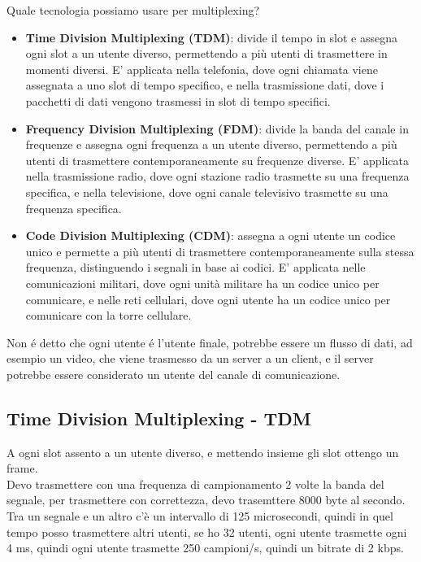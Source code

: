 Quale tecnologia possiamo usare per multiplexing? 
\begin{itemize}
    \item \textbf{Time Division Multiplexing (TDM)}: divide il tempo in slot e assegna ogni 
    slot a un utente diverso, permettendo a più utenti di trasmettere in momenti diversi.
    E' applicata nella telefonia, dove ogni chiamata viene assegnata a uno slot di tempo specifico, 
    e nella trasmissione dati, dove i pacchetti di dati vengono trasmessi in slot di tempo specifici.
    \item \textbf{Frequency Division Multiplexing (FDM)}: divide la banda del canale in frequenze 
    e assegna ogni frequenza a un utente diverso, permettendo a più utenti di trasmettere 
    contemporaneamente su frequenze diverse. E' applicata nella trasmissione radio, dove ogni 
    stazione radio trasmette su una frequenza specifica, e nella televisione, dove ogni canale 
    televisivo trasmette su una frequenza specifica.
    \item \textbf{Code Division Multiplexing (CDM)}: assegna a ogni utente un codice unico e permette 
    a più utenti di trasmettere contemporaneamente sulla stessa frequenza, distinguendo i
    segnali in base ai codici. E' applicata nelle comunicazioni militari, dove ogni unità militare
    ha un codice unico per comunicare, e nelle reti cellulari, dove ogni utente ha un codice unico per 
    comunicare con la torre cellulare.
\end{itemize}

Non é detto che ogni utente é l'utente finale, potrebbe essere un flusso di dati, ad esempio un video, 
che viene trasmesso da un server a un client, e il server potrebbe essere considerato un utente del 
canale di comunicazione.\\

\subsection{Time Division Multiplexing - TDM}
A ogni slot assento a un utente diverso, e mettendo insieme gli slot ottengo
un frame.\\

Devo trasmettere con una frequenza di campionamento 2 volte la banda del segnale, per trasmettere 
con correttezza, devo trasemttere 8000 byte al secondo.
Tra un segnale e un altro c'è un intervallo di 125 microsecondi, quindi in quel tempo posso trasmettere 
altri utenti, se ho 32 utenti, ogni utente trasmette ogni 4 ms, quindi ogni utente trasmette 250 campioni/s, 
quindi un bitrate di 2 kbps.\\

